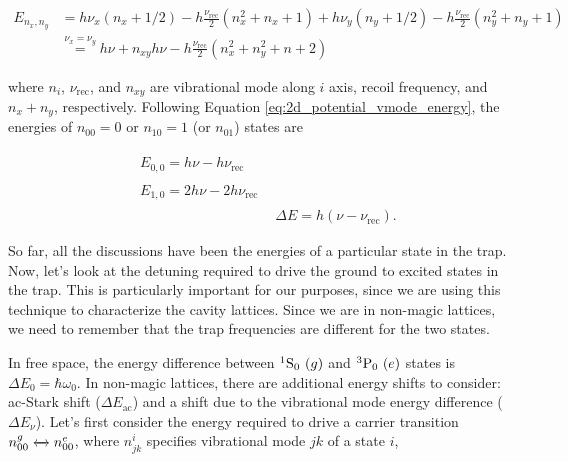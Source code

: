 	\begin{align}\label{eq:2d_potential_vmode_energy}
	E_{n_x,n_y}&=h\nu_{x}(n_{x}+1/2)-h\frac{\nu_{\text{rec}}}{2}(n^{2}_{x}+n_{x}+1)
	+h\nu_{y}(n_{y}+1/2)-h\frac{\nu_{\text{rec}}}{2}(n^{2}_{y}+n_{y}+1) \nonumber\\
	&\stackrel{\nu_x=\nu_y}=h\nu + n_{xy}h\nu - h\frac{\nu_{\text{rec}}}{2}(n^{2}_x+n^{2}_y+n+2)
	\end{align}

	\noindent where $n_{i}$, $\nu_{\text{rec}}$, and $n_{xy}$ are vibrational mode along $i$ axis, recoil frequency, and $n_x+n_y$, respectively. Following Equation \ref{eq:2d_potential_vmode_energy}, the energies of $n_{00}=0$ or $n_{10}=1$ (or $n_{01}$) states are

	\begin{align}
	\begin{split}\label{eq:energy_deep_lattice_n0}
		& E_{0,0}=h\nu-h\nu_{\text{rec}}
	\end{split}\\
	\begin{split}\label{eq:energy_deep_lattice_n1}
		& E_{1,0}=2h\nu-2h\nu_{\text{rec}}
	\end{split}\\
	& \Delta E = h(\nu - \nu_{\text{rec}})\nonumber.
	\end{align}


	\noindent So far, all the discussions have been the energies of a particular state in the trap. Now, let's look at the detuning required to drive the ground to excited states in the trap. This is particularly important for our purposes, since we are using this technique to characterize the cavity lattices. Since we are in non-magic lattices, we need to remember that the trap frequencies are different for the two states.



	In free space, the energy difference between ${{^{1}}\mathrm{S}_{0}} \  (g)$ and ${{^{3}}\mathrm{P}_{0}} \  (e)$ states is $\Delta E_{0}=\hbar\omega_{0}$. In non-magic lattices, there are additional energy shifts to consider: ac-Stark shift ($\Delta E_{\text{ac}}$) and a shift due to the vibrational mode energy difference ($\Delta E_\nu$). Let's first consider the energy required to drive a carrier transition $n^{g}_{00}\xleftrightarrow{}n^{e}_{00}$, where $n^{i}_{jk}$ specifies vibrational mode $jk$ of a state $i$, 

